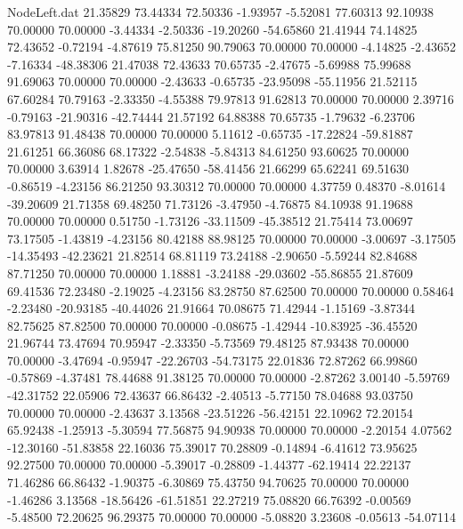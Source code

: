 \begin{filecontents}{NodeLeft.dat}
  21.35829   73.44334   72.50336    -1.93957   -5.52081   77.60313   92.10938   70.00000   70.00000   -3.44334   -2.50336  -19.20260  -54.65860
  21.41944   74.14825   72.43652    -0.72194   -4.87619   75.81250   90.79063   70.00000   70.00000   -4.14825   -2.43652   -7.16334  -48.38306
  21.47038   72.43633   70.65735    -2.47675   -5.69988   75.99688   91.69063   70.00000   70.00000   -2.43633   -0.65735  -23.95098  -55.11956
  21.52115   67.60284   70.79163    -2.33350   -4.55388   79.97813   91.62813   70.00000   70.00000    2.39716   -0.79163  -21.90316  -42.74444
  21.57192   64.88388   70.65735    -1.79632   -6.23706   83.97813   91.48438   70.00000   70.00000    5.11612   -0.65735  -17.22824  -59.81887
  21.61251   66.36086   68.17322    -2.54838   -5.84313   84.61250   93.60625   70.00000   70.00000    3.63914    1.82678  -25.47650  -58.41456
  21.66299   65.62241   69.51630    -0.86519   -4.23156   86.21250   93.30312   70.00000   70.00000    4.37759    0.48370   -8.01614  -39.20609
  21.71358   69.48250   71.73126    -3.47950   -4.76875   84.10938   91.19688   70.00000   70.00000    0.51750   -1.73126  -33.11509  -45.38512
  21.75414   73.00697   73.17505    -1.43819   -4.23156   80.42188   88.98125   70.00000   70.00000   -3.00697   -3.17505  -14.35493  -42.23621
  21.82514   68.81119   73.24188    -2.90650   -5.59244   82.84688   87.71250   70.00000   70.00000    1.18881   -3.24188  -29.03602  -55.86855
  21.87609   69.41536   72.23480    -2.19025   -4.23156   83.28750   87.62500   70.00000   70.00000    0.58464   -2.23480  -20.93185  -40.44026
  21.91664   70.08675   71.42944    -1.15169   -3.87344   82.75625   87.82500   70.00000   70.00000   -0.08675   -1.42944  -10.83925  -36.45520
  21.96744   73.47694   70.95947    -2.33350   -5.73569   79.48125   87.93438   70.00000   70.00000   -3.47694   -0.95947  -22.26703  -54.73175
  22.01836   72.87262   66.99860    -0.57869   -4.37481   78.44688   91.38125   70.00000   70.00000   -2.87262    3.00140   -5.59769  -42.31752
  22.05906   72.43637   66.86432    -2.40513   -5.77150   78.04688   93.03750   70.00000   70.00000   -2.43637    3.13568  -23.51226  -56.42151
  22.10962   72.20154   65.92438    -1.25913   -5.30594   77.56875   94.90938   70.00000   70.00000   -2.20154    4.07562  -12.30160  -51.83858
  22.16036   75.39017   70.28809    -0.14894   -6.41612   73.95625   92.27500   70.00000   70.00000   -5.39017   -0.28809   -1.44377  -62.19414
  22.22137   71.46286   66.86432    -1.90375   -6.30869   75.43750   94.70625   70.00000   70.00000   -1.46286    3.13568  -18.56426  -61.51851
  22.27219   75.08820   66.76392    -0.00569   -5.48500   72.20625   96.29375   70.00000   70.00000   -5.08820    3.23608   -0.05613  -54.07114

\end{filecontents}
